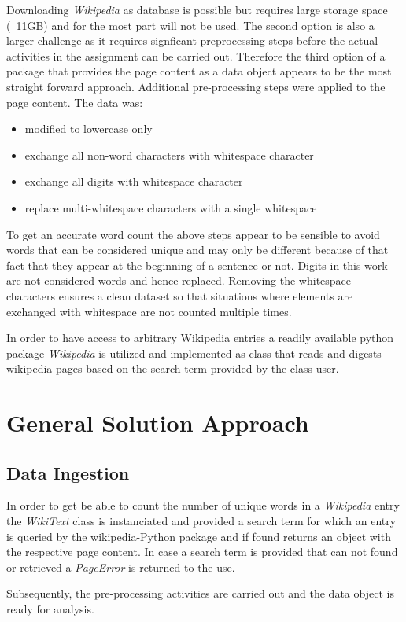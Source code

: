 \documentclass[12pt]{article}
\begin{document}
Downloading \emph{Wikipedia} as database is possible but requires large storage space (~11GB) and for the most part will not be used. The second option is also a larger challenge as it requires signficant preprocessing steps before the actual activities in the assignment can be carried out. Therefore the third option of a package that provides the page content as a data object appears to be the most straight forward approach. Additional pre-processing steps were applied to the page content. The data was:
\begin{itemize}
\item modified to lowercase only
\item exchange all non-word characters with whitespace character
\item exchange all digits with whitespace character
\item replace multi-whitespace characters with a single whitespace
\end{itemize}
To get an accurate word count the above steps appear to be sensible to avoid words that can be considered unique and may only be different because of that fact that they appear at the beginning of a sentence or not. Digits in this work are not considered words and hence replaced. Removing the whitespace characters ensures a clean dataset so that situations where elements are exchanged with whitespace are not counted multiple times.

In order to have access to arbitrary Wikipedia entries a readily available python package \emph{Wikipedia} is utilized and implemented as class that reads and digests wikipedia pages based on the search term provided by the class user.


\section{General Solution Approach}
\subsection{Data Ingestion}
In order to get be able to count the number of unique words in a \emph{Wikipedia} entry the \emph{WikiText} class is instanciated and provided a search term for which an entry is queried by the wikipedia-Python package and if found returns an object with the respective page content. In case a search term is provided that can not found or retrieved a \emph{PageError} is returned to the use.

Subsequently, the pre-processing activities are carried out and the data object is ready for analysis.
\end{document}
